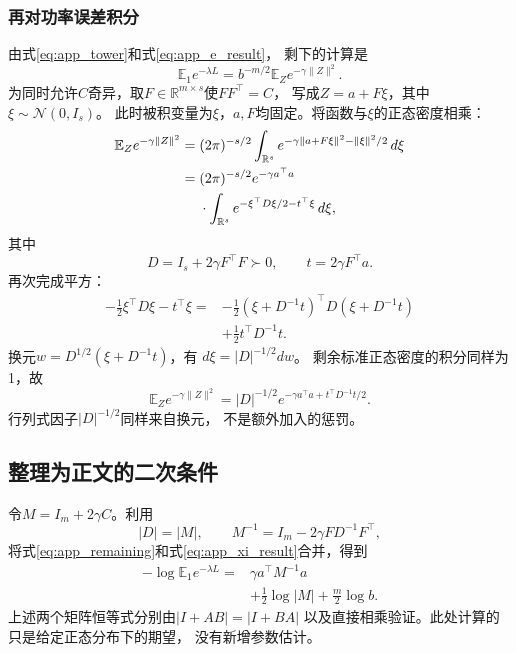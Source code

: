 \documentclass[journal,10pt]{IEEEtran}
\newcommand{\E}{\mathbb E}
\newcommand{\R}{\mathbb R}
\begin{document}
\subsubsection{再对功率误差积分}
由式\eqref{eq:app_tower}和式\eqref{eq:app_e_result}，
剩下的计算是
\begin{equation}
\E_1e^{-\lambda L}=b^{-m/2}\E_Z e^{-\gamma\|Z\|^2}. \label{eq:app_remaining}
\end{equation}
为同时允许$C$奇异，取$F\in\R^{m\times s}$使$FF^\top=C$，
写成$Z=a+F\xi$，其中$\xi\sim\mathcal N(0,I_s)$。
此时被积变量为$\xi$，$a,F$均固定。将函数与$\xi$的正态密度相乘：
\begin{align}
\E_Ze^{-\gamma\|Z\|^2}
={}&(2\pi)^{-s/2}\int_{\R^s}
e^{-\gamma\|a+F\xi\|^2-\|\xi\|^2/2}\,d\xi\notag\\
={}&(2\pi)^{-s/2}e^{-\gamma a^\top a}\notag\\
&\cdot\int_{\R^s}
e^{-\xi^\top D\xi/2-t^\top\xi}\,d\xi, \label{eq:app_xi_integral}
\end{align}
其中
\[
D=I_s+2\gamma F^\top F\succ0,\qquad t=2\gamma F^\top a.
\]
再次完成平方：
\begin{equation}
\begin{split}
-\tfrac12\xi^\top D\xi-t^\top\xi
={}&-\tfrac12(\xi+D^{-1}t)^\top D(\xi+D^{-1}t)\\
&+\tfrac12t^\top D^{-1}t.
\end{split}
\end{equation}
换元$w=D^{1/2}(\xi+D^{-1}t)$，有
$d\xi=|D|^{-1/2}dw$。
剩余标准正态密度的积分同样为1，故
\begin{equation}
\E_Ze^{-\gamma\|Z\|^2}
=|D|^{-1/2}
e^{-\gamma a^\top a+t^\top D^{-1}t/2}. \label{eq:app_xi_result}
\end{equation}
行列式因子$|D|^{-1/2}$同样来自换元，
不是额外加入的惩罚。

\subsection{整理为正文的二次条件}
令$M=I_m+2\gamma C$。利用
\[
|D|=|M|,\qquad
M^{-1}=I_m-2\gamma FD^{-1}F^\top,
\]
将式\eqref{eq:app_remaining}和式\eqref{eq:app_xi_result}合并，得到
\begin{equation}
\begin{split}
-\log\E_1e^{-\lambda L}
={}&\gamma a^\top M^{-1}a\\
&+\frac12\log|M|+\frac m2\log b.
\end{split} \label{eq:app_closed}
\end{equation}
上述两个矩阵恒等式分别由$|I+AB|=|I+BA|$
以及直接相乘验证。此处计算的只是给定正态分布下的期望，
没有新增参数估计。
\end{document}
